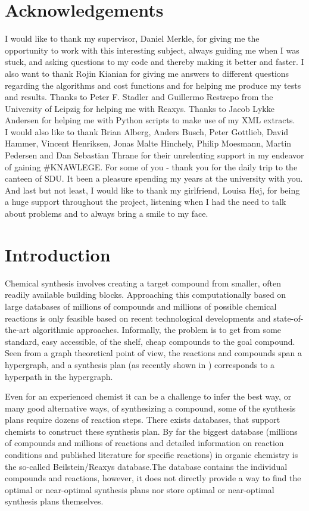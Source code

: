 \documentclass[a4paper,10pt,titlepage]{paper}
\begin{document}
\section{Acknowledgements}
I would like to thank my supervisor, Daniel Merkle, for giving me the opportunity to work with this interesting subject, always guiding me when I was stuck, and asking questions to my code and thereby making it better and faster. I also want to thank Rojin Kianian for giving me answers to different questions regarding the algorithms and cost functions and for helping me produce my tests and results. Thanks to Peter F. Stadler and Guillermo Restrepo from the University of Leipzig for helping me with Reaxys. Thanks to Jacob Lykke Andersen for helping me with Python scripts to make use of my XML extracts.\\
I would also like to thank Brian Alberg, Anders Busch, Peter Gottlieb, David Hammer, Vincent Henriksen, Jonas Malte Hinchely, Philip Moesmann, Martin Pedersen and Dan Sebastian Thrane for their unrelenting support in my endeavor of gaining \#KNAWLEGE. For some of you - thank you for the daily trip to the canteen of SDU. It been a pleasure spending my years at the university with you.\\
And last but not least, I would like to thank my girlfriend, Louisa Høj, for being a huge support throughout the project, listening when I had the need to talk about problems and to always bring a smile to my face.

\section{Introduction}
Chemical synthesis involves creating a target compound from smaller, often readily available building blocks. Approaching this computationally based on large databases of millions of compounds and millions of possible chemical reactions is only feasible based on recent technological developments and state-of-the-art algorithmic approaches. Informally, the problem is to get from some standard, easy accessible, of the shelf, cheap compounds to the goal compound. Seen from a graph theoretical point of view, the reactions and compounds span a hypergraph, and a synthesis plan (as recently shown in \cite{Fagerberg}) corresponds to a hyperpath in the hypergraph.

Even for an experienced chemist it can be a challenge to infer the best way, or many good alternative ways, of synthesizing a compound, some of the synthesis plans require dozens of reaction steps. There exists databases, that support chemists to construct these synthesis plan. By far the biggest database (millions of compounds and millions of reactions and detailed information on reaction conditions and published literature for specific reactions) in organic chemistry is the so-called Beilstein/Reaxys database\cite{WikiReaxys}\cite{WikiBeilstein}.The database contains the individual compounds and reactions, however, it does not directly provide a way to find the optimal or near-optimal synthesis plans nor store optimal or near-optimal synthesis plans themselves.
\end{document}
